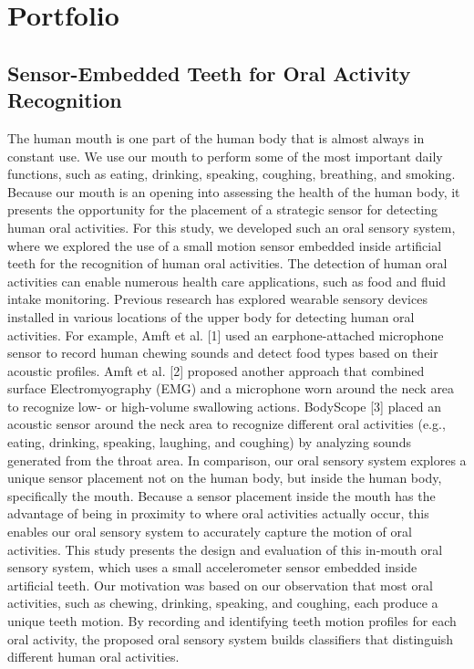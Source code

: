 \chapter{Portfolio}

\section{Sensor-Embedded Teeth for Oral Activity Recognition}

The human mouth is one part of the human body that is almost always in constant use. We use our mouth to perform some of the most important daily functions, such as eating, drinking, speaking, coughing, breathing, and smoking. Because our mouth is an opening into assessing the health of the human body, it presents the opportunity for the placement of a strategic sensor for detecting human oral activities. For this study, we developed such an oral sensory system, where we explored the use of a small motion sensor embedded inside artificial teeth for the recognition of human oral activities. The detection of human oral activities can enable numerous health care applications, such as food and fluid intake monitoring.   
Previous research has explored wearable sensory devices installed in various locations of the upper body for detecting human oral activities. For example, Amft et al. [1] used an earphone-attached microphone sensor to record human chewing sounds and detect food types based on their acoustic profiles. Amft et al. [2] proposed another approach that combined surface Electromyography (EMG) and a microphone worn around the neck area to recognize low- or high-volume swallowing actions. BodyScope [3] placed an acoustic sensor around the neck area to recognize different oral activities (e.g., eating, drinking, speaking, laughing, and coughing) by analyzing sounds generated from the throat area. In comparison, our oral sensory system explores a unique sensor placement not on the human body, but inside the human body, specifically the mouth. Because a sensor placement inside the mouth has the advantage of being in proximity to where oral activities actually occur, this enables our oral sensory system to accurately capture the motion of oral activities. 
This study presents the design and evaluation of this in-mouth oral sensory system, which uses a small accelerometer sensor embedded inside artificial teeth. Our motivation was based on our observation that most oral activities, such as chewing, drinking, speaking, and coughing, each produce a unique teeth motion. By recording and identifying teeth motion profiles for each oral activity, the proposed oral sensory system builds classifiers that distinguish different human oral activities. 

